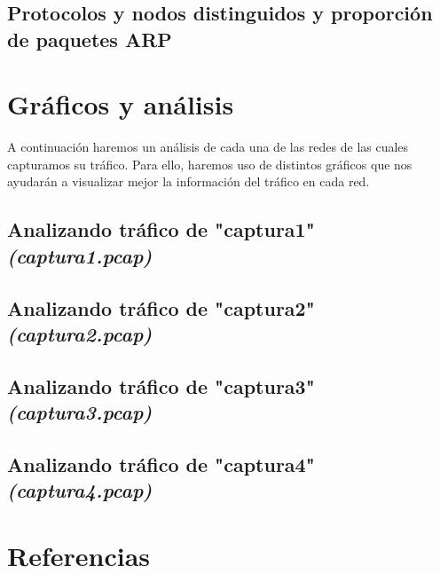 \documentclass[final,inline,narroweqnarray,a4paper]{ieee}
\begin{document}
\subsection{Protocolos y nodos distinguidos y proporción de paquetes ARP}
	
\section{Gráficos y análisis}

A continuación haremos un análisis de cada una de las redes de las cuales capturamos su tráfico. Para ello, haremos uso de distintos gráficos que nos ayudarán a visualizar mejor la información del tráfico en cada red.

\subsection{Analizando tráfico de "captura1" \emph{(captura1.pcap)}}

\subsection{Analizando tráfico de "captura2" \emph{(captura2.pcap)}}

\subsection{Analizando tráfico de "captura3" \emph{(captura3.pcap)}}

\subsection{Analizando tráfico de "captura4" \emph{(captura4.pcap)}}

\section{Referencias}
\end{document}
